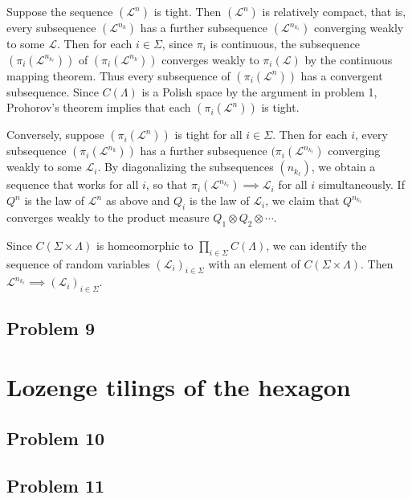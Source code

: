 \documentclass[12pt]{article}
\begin{document}
		Suppose the sequence $(\mathcal{L}^n)$ is tight. Then $(\mathcal{L}^n)$ is relatively compact, that is, every subsequence $(\mathcal{L}^{n_k})$ has a further subsequence $(\mathcal{L}^{n_{k_\ell}})$ converging weakly to some $\mathcal{L}$. Then for each $i\in\Sigma$, since $\pi_i$ is continuous, the subsequence $(\pi_i(\mathcal{L}^{n_{k_\ell}}))$ of $(\pi_i(\mathcal{L}^{n_k}))$ converges weakly to $\pi_i(\mathcal{L})$ by the continuous mapping theorem. Thus every subsequence of $(\pi_i(\mathcal{L}^n))$ has a convergent subsequence. Since $C(\Lambda)$ is a Polish space by the argument in problem 1, Prohorov's theorem implies that each $(\pi_i(\mathcal{L}^n))$ is tight.
		
		Conversely, suppose $(\pi_i(\mathcal{L}^n))$ is tight for all $i\in\Sigma$. Then for each $i$, every subsequence $(\pi_i(\mathcal{L}^{n_k}))$ has a further subsequence $(\pi_i(\mathcal{L}^{n_{k_\ell}})$ converging weakly to some $\mathcal{L}_i$. By diagonalizing the subsequences $(n_{k_\ell})$, we obtain a sequence that works for all $i$, so that $\pi_i(\mathcal{L}^{n_{k_\ell}})\implies \mathcal{L}_i$ for all $i$ simultaneously. If $Q^n$ is the law of $\mathcal{L}^n$ as above and $Q_i$ is the law of $\mathcal{L}_i$, we claim that $Q^{n_{k_\ell}}$ converges weakly to the product measure $Q_1 \otimes Q_2 \otimes \cdots$.
		
		Since $C(\Sigma\times\Lambda)$ is homeomorphic to $\prod_{i\in\Sigma} C(\Lambda)$, we can identify the sequence of random variables $(\mathcal{L}_i)_{i\in\Sigma}$ with an element of $C(\Sigma\times\Lambda)$. Then $\mathcal{L}^{n_{k_\ell}}\implies (\mathcal{L}_i)_{i\in\Sigma}$.
	
	\subsection*{Problem 9}


\section{Lozenge tilings of the hexagon}

	\subsection*{Problem 10}
	
	\subsection*{Problem 11}
\end{document}
